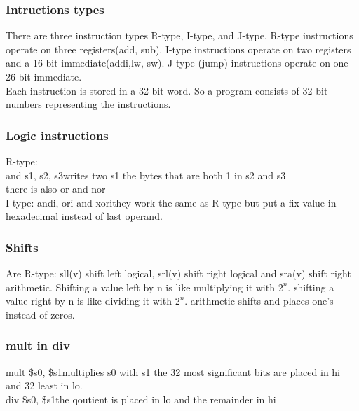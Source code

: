 		\subsubsection{Intructions types}
		There are three instruction types R-type, I-type, and J-type. R-type instructions operate on three registers(add, sub). I-type instructions operate on two registers and a 16-bit immediate(addi,lw, sw). J-type (jump) instructions operate on one 26-bit immediate.\\Each instruction is stored in a 32 bit word. So a program consists of 32 bit numbers representing the instructions.
		\subsubsection{Logic instructions}
		R-type:\\ and s1, s2, s3\tab writes two s1 the bytes that are both 1 in s2 and s3\\
		there is also or and nor\\
		I-type: andi, ori and xori\tab they work the same as R-type but put a fix value in hexadecimal instead of last operand.
		\subsubsection{Shifts}
		Are R-type: sll(v) shift left logical, srl(v) shift right logical and sra(v) shift right arithmetic. Shifting a value left by n is like multiplying it with $2^n$. shifting a value right by n is like dividing it with $2^n$. arithmetic shifts and places one's instead of zeros.
		\subsubsection{mult in div}
		mult \$s0, \$s1\tab multiplies s0 with s1 the 32 most significant bits are placed in hi and 32 least in lo.\\
		div \$s0, \$s1\tab the qoutient is placed in lo and the remainder in hi
